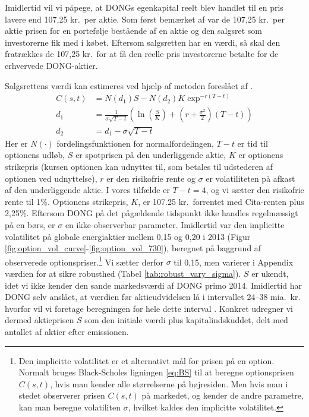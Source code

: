 \documentclass{article}
\begin{document}
Imidlertid vil vi påpege, at DONGs egenkapital reelt blev handlet til en pris lavere end 107,25 kr.\ per aktie. Som først bemærket af \cite{Moeller2014} var de 107,25 kr.\ per aktie prisen for en portefølje bestående af en aktie og den salgsret som investorerne fik med i købet. Eftersom salgsretten har en værdi, så skal den fratrækkes de 107,25 kr.\ for at få den reelle pris investorerne betalte for de erhvervede DONG-aktier.

Salgsrettens værdi kan estimeres ved hjælp af metoden foreslået af \cite{Black1973}. 
\begin{align}
C(s,t)&=N(d_1)S-N(d_2)K \exp^{-r(T-t)} \label{eq:BS}\\
d_1&= \frac{1}{\sigma\sqrt{T-t}}\left( \ln\left( \frac{S}{K} \right)+\left(r+\frac{\sigma^2}{2} \right)(T-t) \right) \nonumber \\
d_2&=d_1-\sigma \sqrt{T-t} \nonumber
\end{align}
Her er $N(\cdot)$ fordelingsfunktionen for normalfordelingen, $T-t$ er tid til optionens udløb, $S$ er spotprisen på den underliggende aktie, $K$ er optionens strikepris (kursen optionen kan udnyttes til, som betales til udstederen af optionen ved udnyttelse), $r$ er den risikofrie rente og $\sigma$ er volatiliteten på afkast af den underliggende aktie. I vores tilfælde er $T-t=4$, og vi sætter den risikofrie rente til 1\%. Optionens strikepris, $K$, er 107.25 kr.\ forrentet med Cita-renten plus 2,25\%. Eftersom DONG på det pågældende tidspunkt ikke handles regelmæssigt på en børs, er $\sigma$ en ikke-observerbar parameter. Imidlertid var den implicitte volatilitet på globale energiaktier mellem 0,15 og 0,20 i 2013 (Figur \ref{fig:option_vol_curve}-\ref{fig:option_vol_730}), beregnet på baggrund af observerede optionspriser.\footnote{Den implicitte volatilitet er et alternativt mål for prisen på en option. Normalt bruges Black-Scholes ligningen \eqref{eq:BS} til at beregne optionsprisen $C(s, t)$, hvis man kender alle størrelserne på højresiden. Men hvis man i stedet observerer prisen $C(s, t)$ på markedet, og kender de andre parametre, kan man beregne volatiliten $\sigma$, hvilket kaldes den implicitte volatilitet.}
Vi sætter derfor $\sigma$ til 0,15, men varierer i Appendix værdien for at sikre robusthed (Tabel \ref{tab:robust_vary_sigma}). $S$ er ukendt, idet vi ikke kender den sande markedsværdi af DONG primo 2014. Imidlertid har DONG selv anslået, at værdien før aktieudvidelsen lå i intervallet 24--38 mia.\ kr.\, hvorfor vil vi foretage beregningen for hele dette interval \citep{DONG2015b}. Konkret udregner vi dermed aktieprisen $S$ som den initiale værdi plus kapitalindskuddet, delt med antallet af aktier efter emissionen. 
\end{document}
